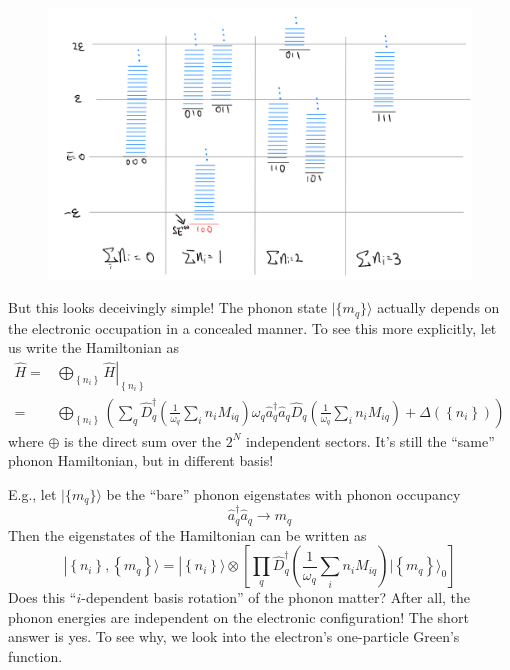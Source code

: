 \begin{figure}[ht]
    \centering
    \includegraphics[width=\textwidth]{jupyterbook/data/fig/lec06-fig03.png}
\end{figure}

But this looks deceivingly simple! The phonon state $|\{m_q\} \rangle$ actually depends on the electronic occupation in a concealed manner. To see this more explicitly, let us write the Hamiltonian as
\begin{align*}
    \hat{H}=&\bigoplus_{\left\{ n_i \right\}}{\left. \hat{H} \right|_{\left\{ n_i \right\}}}\\
    =&\bigoplus_{\left\{ n_i \right\}}{\left( \sum_q{\hat{D}_{q}^{\dagger}\left( \frac{1}{\omega _q}\sum_i{n_iM_{iq}} \right) \omega _q\hat{a}_{q}^{\dagger}\hat{a}_q\hat{D}_q\left( \frac{1}{\omega _q}\sum_i{n_iM_{iq}} \right)}+\Delta \left( \left\{ n_i \right\} \right) \right)}
\end{align*}
where $\oplus$ is the direct sum over the $2^N$ independent sectors. It's still the ``same'' phonon Hamiltonian, but in different basis!

E.g., let $|\{m_q\}\rangle$ be the ``bare'' phonon eigenstates with phonon occupancy
\[ \hat{a}_{q}^{\dagger}\hat{a}_q\rightarrow m_q\]
Then the eigenstates of the Hamiltonian can be written as
\[ |\left\{ n_i \right\} ,\left\{ m_q \right\} \rangle =|\left\{ n_i \right\} \rangle \otimes \left[ \prod_q{\hat{D}_{q}^{\dagger}\left( \frac{1}{\omega _q}\sum_i{n_iM_{iq}} \right) |\left\{ m_q \right\} \rangle _0} \right] \]
Does this ``$i$-dependent basis rotation'' of the phonon matter? After all, the phonon energies are independent on the electronic configuration! The short answer is yes. To see why, we look into the electron's one-particle Green's function.

